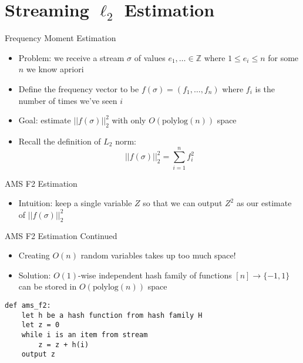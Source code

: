 \documentclass[aspectratio=169]{beamer}
\begin{document}
\section{Streaming $\ell_2$ Estimation}

\frame{\sectionpage}

\begin{frame}{Frequency Moment Estimation}
\protect\hypertarget{frequency-moment-estimation}{}
\begin{itemize}
\tightlist
\item
  Problem: we receive a stream \(\sigma\) of values
  \(e_1,\dots \in \mathbb{Z}\) where \(1 \leq e_i \leq n\) for some
  \(n\) we know apriori \pause
\item
  Define the frequency vector to be \(f(\sigma) = (f_1,\dots,f_n)\)
  where \(f_i\) is the number of times we've seen \(i\) \pause
\item
  Goal: estimate \(||f(\sigma)||_2^2\) with only
  \(O(\text{polylog}(n))\) space \pause
\item
  Recall the definition of \(L_2\) norm:
  \[||f(\sigma)||_2^2 = \sum_{i=1}^n f_i^2\]
\end{itemize}
\end{frame}

\begin{frame}{AMS F2 Estimation}
\protect\hypertarget{ams-f2-estimation}{}
\begin{itemize}
\tightlist
\item
  Intuition: keep a single variable \(Z\) so that we can output \(Z^2\)
  as our estimate of \(||f(\sigma)||_2^2\)
\end{itemize}
\end{frame}

\begin{frame}[fragile]{AMS F2 Estimation Continued}
\protect\hypertarget{ams-f2-estimation-continued}{}
\begin{itemize}
\tightlist
\item
  Creating \(O(n)\) random variables takes up too much space!
\item
  Solution: \(O(1)\)-wise independent hash family of functions
  \([n] \to \{-1,1\}\) can be stored in \(O(\text{polylog}(n))\) space
\end{itemize}

\begin{verbatim}
def ams_f2:
    let h be a hash function from hash family H
    let z = 0
    while i is an item from stream
        z = z + h(i)
    output z
\end{verbatim}
\end{frame}
\end{document}
